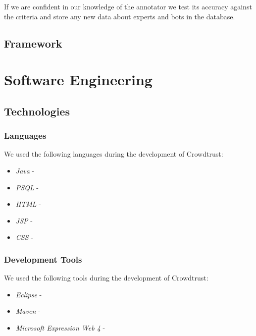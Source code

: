 \documentclass[11pt]{article}
\begin{document}
If we are confident in our knowledge of the annotator we test its accuracy against the criteria and store any new data about experts and bots in the database.\\


\subsection{Framework}
 
 
\section{Software Engineering}
\subsection{Technologies}
\subsubsection{Languages}
We used the following languages during the development of Crowdtrust:
\begin{itemize}
\item
\emph{Java} -
\item
\emph{PSQL} -
\item
\emph{HTML} -
\item
\emph{JSP} -
\item
\emph{CSS} -
\end{itemize}
\subsubsection{Development Tools}
We used the following tools during the development of Crowdtrust:
\begin{itemize}
\item
\emph{Eclipse} - 
\item
\emph{Maven} - 
\item
\emph{Microsoft Expression Web 4} - 
\end{itemize}
\end{document}
